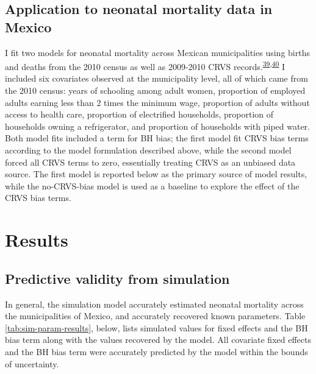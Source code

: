\documentclass[
]{article}
\begin{document}
\hypertarget{application-to-neonatal-mortality-data-in-mexico}{%
\subsection{Application to neonatal mortality data in Mexico}\label{application-to-neonatal-mortality-data-in-mexico}}

I fit two models for neonatal mortality across Mexican municipalities using births and deaths from the 2010 census as well as 2009-2010 CRVS records.\textsuperscript{\protect\hyperlink{ref-INEGI2010}{39},\protect\hyperlink{ref-INEGI2010a}{40}} I included six covariates observed at the municipality level, all of which came from the 2010 census: years of schooling among adult women, proportion of employed adults earning less than 2 times the minimum wage, proportion of adults without access to health care, proportion of electrified households, proportion of households owning a refrigerator, and proportion of households with piped water. Both model fits included a term for BH bias; the first model fit CRVS bias terms according to the model formulation described above, while the second model forced all CRVS terms to zero, essentially treating CRVS as an unbiased data source. The first model is reported below as the primary source of model results, while the no-CRVS-bias model is used as a baseline to explore the effect of the CRVS bias terms.

\hypertarget{results}{%
\section{Results}\label{results}}

\hypertarget{predictive-validity-from-simulation}{%
\subsection{Predictive validity from simulation}\label{predictive-validity-from-simulation}}

In general, the simulation model accurately estimated neonatal mortality across the municipalities of Mexico, and accurately recovered known parameters. Table \ref{tab:sim-param-results}, below, lists simulated values for fixed effects and the BH bias term along with the values recovered by the model. All covariate fixed effects and the BH bias term were accurately predicted by the model within the bounds of uncertainty.
\end{document}
